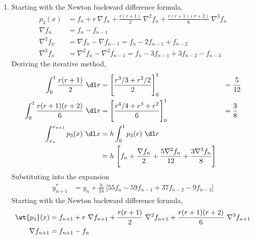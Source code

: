 \begin{enumerate}
    \item Starting with the Newton backward difference formula,
          \begin{align}
              p_3(x)       & = f_n + r\ \nabla f_n + \frac{r(r+1)}{2}\ \nabla^2 f_n
              + \frac{r(r+1)(r+2)}{6}\ \nabla^3 f_n                                 \\
              \nabla f_n   & = f_{n} - f_{n-1}                                      \\
              \nabla^2 f_n & = \nabla f_n - \nabla f_{n-1} =
              f_n - 2 f_{n-1} + f_{n-2}                                             \\
              \nabla^3 f_n & = \nabla^2 f_n - \nabla^2 f_{n-1} =
              f_n - 3 f_{n-1} + 3 f_{n-2} - f_{n-3}
          \end{align}
          Deriving the iterative method,
          \begin{align}
              \int_{0}^{1} \frac{r(r+1)}{2}\ \dl r          & =
              \Bigg[ \frac{r^3/3 + r^2/2}{2} \Bigg]_0^1     &
                                                            & = \frac{5}{12} \\
              \int_{0}^{1} \frac{r(r+1)(r+2)}{6}\ \dl r     & =
              \Bigg[ \frac{r^4/4 + r^3 + r^2}{6} \Bigg]_0^1 &
                                                            & = \frac{3}{8}  \\
              \int_{x_n}^{x_{n+1}}p_3(x)\ \dl x             & =
              h\int_{0}^{1} p_3(r)\ \dl r                                    \\
                                                            &
              = h\ \Bigg[ f_n + \frac{\nabla f_n}{2} + \frac{5\nabla^2 f_n}{12}
                  + \frac{3\nabla^3 f_n}{8} \Bigg]
          \end{align}
          Substituting into the expansion
          \begin{align}
              y^*_{n+1} & = y_n + \frac{h}{24}
              \ \Bigg[ 55f_n - 59f_{n-1} + 37f_{n-2} - 9f_{n-3} \Bigg]
          \end{align}
          Starting with the Newton backward difference formula,
          \begin{align}
              \wt{p_3}(x)      & = f_{n+1} + r\ \nabla f_{n+1} + \frac{r(r+1)}{2}
              \ \nabla^2 f_{n+1}
              + \frac{r(r+1)(r+2)}{6}\ \nabla^3 f_{n+1}                           \\
              \nabla f_{n+1}   & = f_{n+1} - f_{n}                                \\

\end{align}
\end{enumerate}
